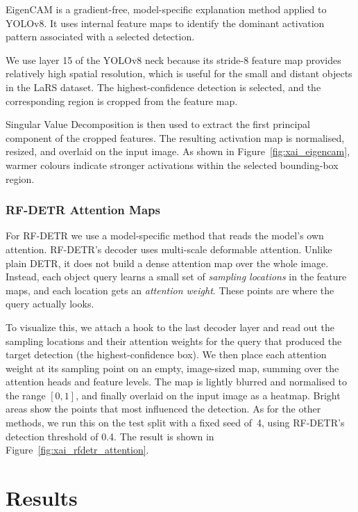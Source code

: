 \documentclass[11pt,a4paper]{article}
\begin{document}
EigenCAM is a gradient-free, model-specific explanation method applied to
YOLOv8. It uses internal feature maps to identify the dominant activation
pattern associated with a selected detection.

We use layer 15 of the YOLOv8 neck because its stride-8 feature map provides
relatively high spatial resolution, which is useful for the small and distant
objects in the LaRS dataset. The highest-confidence detection is selected, and
the corresponding region is cropped from the feature map.

Singular Value Decomposition is then used to extract the first principal
component of the cropped features. The resulting activation map is normalised,
resized, and overlaid on the input image. As shown in
Figure~\ref{fig:xai_eigencam}, warmer colours indicate stronger activations
within the selected bounding-box region.



\subsubsection{RF-DETR Attention Maps}
For RF-DETR we use a model-specific method that reads the model's own attention.
RF-DETR's decoder uses multi-scale deformable attention. Unlike plain DETR, it
does not build a dense attention map over the whole image. Instead, each object
query learns a small set of \emph{sampling locations} in the feature maps, and
each location gets an \emph{attention weight}. These points are where the query
actually looks.

To visualize this, we attach a hook to the last decoder layer and read out the
sampling locations and their attention weights for the query that produced the
target detection (the highest-confidence box). We then place each attention
weight at its sampling point on an empty, image-sized map, summing over the
attention heads and feature levels. The map is lightly blurred and normalised to
the range $[0, 1]$, and finally overlaid on the input image as a heatmap. Bright
areas show the points that most influenced the detection. As for the other
methods, we run this on the test split with a fixed seed of~4, using RF-DETR's
detection threshold of 0.4. The result is shown in
Figure~\ref{fig:xai_rfdetr_attention}.

\section{Results}
\end{document}
